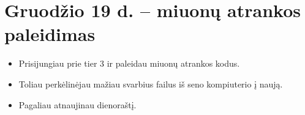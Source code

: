 \documentclass[a4paper, 12pt]{article}
\begin{document}
\section{Gruodžio 19 d. -- miuonų atrankos paleidimas}
\begin{itemize}
	\item Prisijungiau prie tier 3 ir paleidau miuonų atrankos kodus.
	\item Toliau perkėlinėjau mažiau svarbius failus iš seno kompiuterio į naują.
	\item Pagaliau atnaujinau dienoraštį.
\end{itemize}




\end{document}
